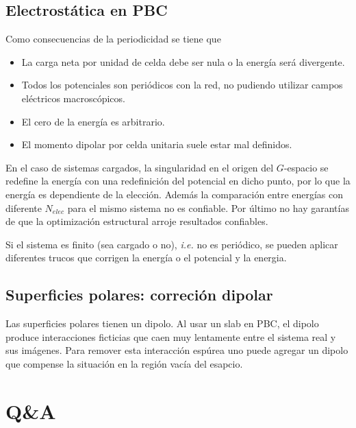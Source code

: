 \subsection{Electrostática en PBC}

  Como consecuencias de la periodicidad se tiene que
    \begin{itemize}
      \item La carga neta por unidad de celda debe ser nula o la energía será divergente.
      \item Todos los potenciales son periódicos con la red, no pudiendo utilizar campos eléctricos macroscópicos.
      \item El cero de la energía es arbitrario.
      \item El momento dipolar por celda unitaria suele estar mal definidos.
    \end{itemize}

  En el caso de sistemas cargados, la singularidad en el origen del $G$-espacio se redefine la energía con una redefinición del potencial en dicho punto, por lo que la energía es dependiente de la elección. Además la comparación entre energías con diferente $N_{elec}$ para el mismo sistema no es confiable. Por último no hay garantías de que la optimización estructural arroje resultados confiables.

  Si el sistema es finito (sea cargado o no), \emph{i.e.} no es periódico, se pueden aplicar diferentes trucos que corrigen la energía o el potencial y la energia.

\subsection{Superficies polares: correción dipolar}

  Las superficies polares tienen un dipolo. Al usar un slab en PBC, el dipolo produce interacciones ficticias que caen muy lentamente entre el sistema real y sus imágenes. Para remover esta interacción espúrea uno puede agregar un dipolo que compense la situación en la región vacía del esapcio.


\section{Q\&A}


